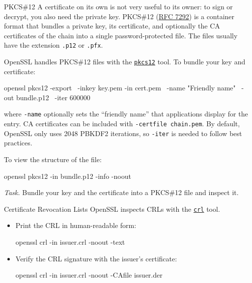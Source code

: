 \documentclass{practice}
\begin{document}
\begin{task}{PKCS\#12}
  A certificate on its own is not very useful to its owner: to sign or decrypt, you also need the private key.
  PKCS\#12 (\href{https://datatracker.ietf.org/doc/html/rfc7292}{RFC 7292}) is a container format that bundles a private key, its certificate, and optionally the CA certificates of the chain into a single password-protected file.
  The files usually have the extension \texttt{.p12} or \texttt{.pfx}.

  OpenSSL handles PKCS\#12 files with the \href{https://docs.openssl.org/master/man1/openssl-pkcs12/}{\texttt{pkcs12}} tool.
  To bundle your key and certificate:
  \begin{cmdblock}
openssl pkcs12 -export \
  -inkey key.pem -in cert.pem \
  -name "Friendly name" \
  -out bundle.p12 \
  -iter 600000
  \end{cmdblock}
  where \texttt{-name} optionally sets the \enquote{friendly name} that applications display for the entry.
  CA certificates can be included with \texttt{-certfile chain.pem}.
  By default, OpenSSL only uses 2048 PBKDF2 iterations, so \texttt{-iter} is needed to follow best practices. 

  To view the structure of the file:
  \begin{cmdblock}
openssl pkcs12 -in bundle.p12 -info -noout
  \end{cmdblock}

  \textit{Task.}
  Bundle your key and the certificate into a PKCS\#12 file and inspect it.
\end{task}

\begin{task}{Certificate Revocation Lists}
  OpenSSL inspects CRLs with the \href{https://docs.openssl.org/master/man1/openssl-crl/}{\texttt{crl}} tool.
  \begin{itemize}
    \item Print the CRL in human-readable form:
    \begin{cmdblock}
openssl crl -in issuer.crl -noout -text
    \end{cmdblock}
    \item Verify the CRL signature with the issuer's certificate:
    \begin{cmdblock}
openssl crl -in issuer.crl -noout -CAfile issuer.der
    \end{cmdblock}
  \end{itemize}
\end{task}
\end{document}
